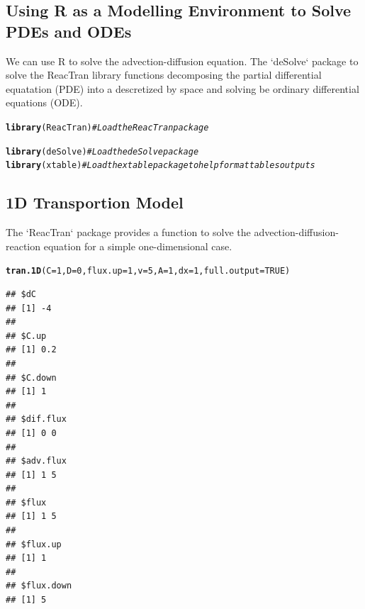 \documentclass{tufte-handout}\usepackage[]{graphicx}\usepackage[]{xcolor}
\makeatletter
\newcommand{\hlnum}[1]{\textcolor[rgb]{0.686,0.059,0.569}{#1}}%
\newcommand{\hlcom}[1]{\textcolor[rgb]{0.678,0.584,0.686}{\textit{#1}}}%
\newcommand{\hlstd}[1]{\textcolor[rgb]{0.345,0.345,0.345}{#1}}%
\newcommand{\hlkwc}[1]{\textcolor[rgb]{0.333,0.667,0.333}{#1}}%
\newcommand{\hlkwd}[1]{\textcolor[rgb]{0.737,0.353,0.396}{\textbf{#1}}}%
\newenvironment{kframe}{%
 \def\at@end@of@kframe{}%
 \ifinner\ifhmode%
  \def\at@end@of@kframe{\end{minipage}}%
  \begin{minipage}{\columnwidth}%
 \fi\fi%
 \def\FrameCommand##1{\hskip\@totalleftmargin \hskip-\fboxsep
 \colorbox{shadecolor}{##1}\hskip-\fboxsep
     \hskip-\linewidth \hskip-\@totalleftmargin \hskip\columnwidth}%
 \MakeFramed {\advance\hsize-\width
   \@totalleftmargin\z@ \linewidth\hsize
   \@setminipage}}%
 {\par\unskip\endMakeFramed%
 \at@end@of@kframe}
\newenvironment{knitrout}{}{} %
\makeatother
\begin{document}
\subsection{Using R as a Modelling Environment to Solve PDEs and ODEs}

We can use R to solve the advection-diffusion equation. The `deSolve` package to solve the ReacTran library functions decomposing the partial differential equatation (PDE) into a descretized by space and solving be ordinary differential equations (ODE). 

\begin{knitrout}
\color{fgcolor}\begin{kframe}
\begin{alltt}
\hlkwd{library}\hlstd{(ReacTran)} \hlcom{# Load the ReacTran package}
\end{alltt}


{\ttfamily\noindent\itshape\color{messagecolor}{\#\# Loading required package: rootSolve}}

{\ttfamily\noindent\itshape\color{messagecolor}{\#\# Loading required package: deSolve}}

{\ttfamily\noindent\itshape\color{messagecolor}{\#\# Loading required package: shape}}\begin{alltt}
\hlkwd{library}\hlstd{(deSolve)} \hlcom{# Load the deSolve package}
\hlkwd{library}\hlstd{(xtable)} \hlcom{# Load the xtable package to help format tables outputs}
\end{alltt}
\end{kframe}
\end{knitrout}

\subsection{1D Transportion Model}

The `ReacTran` package provides a function to solve the advection-diffusion-reaction equation for a simple one-dimensional case.

\begin{knitrout}
\color{fgcolor}\begin{kframe}
\begin{alltt}
\hlkwd{tran.1D}\hlstd{(}\hlkwc{C} \hlstd{=} \hlnum{1}\hlstd{,} \hlkwc{D} \hlstd{=} \hlnum{0}\hlstd{,} \hlkwc{flux.up} \hlstd{=} \hlnum{1}\hlstd{,} \hlkwc{v} \hlstd{=} \hlnum{5}\hlstd{,} \hlkwc{A}\hlstd{=} \hlnum{1}\hlstd{,} \hlkwc{dx} \hlstd{=} \hlnum{1}\hlstd{,} \hlkwc{full.output} \hlstd{=} \hlnum{TRUE}\hlstd{)}
\end{alltt}
\begin{verbatim}
## $dC
## [1] -4
## 
## $C.up
## [1] 0.2
## 
## $C.down
## [1] 1
## 
## $dif.flux
## [1] 0 0
## 
## $adv.flux
## [1] 1 5
## 
## $flux
## [1] 1 5
## 
## $flux.up
## [1] 1
## 
## $flux.down
## [1] 5
\end{verbatim}
\end{kframe}
\end{knitrout}
\end{document}
